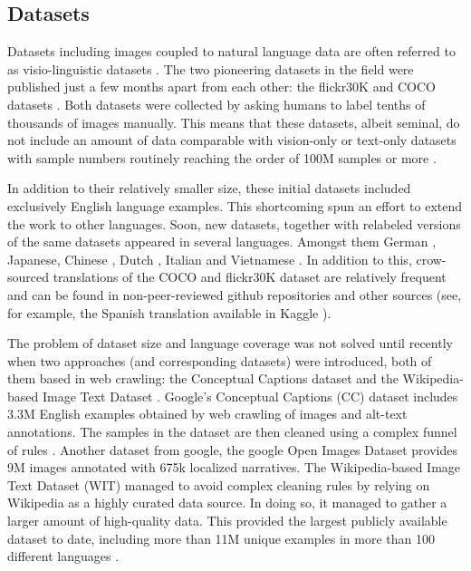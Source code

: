 \documentclass[10pt,twocolumn,letterpaper]{article}
\begin{document}
\subsection{Datasets}
Datasets including images coupled to natural language data are often referred to as visio-linguistic datasets \cite{srinivasan2021wit}. The two pioneering datasets in the field were published just a few months apart from each other: the flickr30K and COCO datasets \cite{young2014image,lin2014microsoft}. Both datasets were collected by asking humans to label tenths of thousands of images manually. This means that these datasets, albeit seminal, do not include an amount of data comparable with vision-only or text-only datasets with sample numbers routinely reaching the order of 100M samples or more \cite{thomee2016yfcc100m,lin2014microsoft,sun2017revisiting,yalniz2019billion}.

In addition to their relatively smaller size, these initial datasets included exclusively English language examples. This shortcoming spun an effort to extend the work to other languages. Soon, new datasets, together with relabeled versions of the same datasets appeared in several languages. Amongst them German \cite{hitschler2016multimodal}, Japanese\cite{P16-1168}, Chinese \cite{li2019coco}, Dutch \cite{van2018didec}, Italian \cite{antonio2019large} and Vietnamese \cite{lam2020uit}. In addition to this, crow-sourced translations of the COCO and flickr30K dataset are relatively frequent and can be found in non-peer-reviewed github repositories and other sources (see, for example, the Spanish translation available in Kaggle \cite{garcia_2020}).

The problem of dataset size and language coverage was not solved until recently when two approaches (and corresponding datasets) were introduced, both of them based in web crawling: the Conceptual Captions dataset \cite{sharma2018conceptual} and the Wikipedia-based Image Text Dataset \cite{srinivasan2021wit}. Google's Conceptual Captions (CC) dataset includes 3.3M English examples obtained by web crawling of images and alt-text annotations. The samples in the dataset are then cleaned using a complex funnel of rules \cite{sharma2018conceptual}. Another dataset from google, the google Open Images Dataset \cite{kuznetsova2020open} provides 9M images annotated with 675k localized narratives. The Wikipedia-based Image Text Dataset (WIT) managed to avoid complex cleaning rules by relying on Wikipedia as a highly curated data source. In doing so, it managed to gather a larger amount of high-quality data. This provided the largest publicly available dataset to date, including more than 11M unique examples in more than 100 different languages \cite{srinivasan2021wit}.
\end{document}
